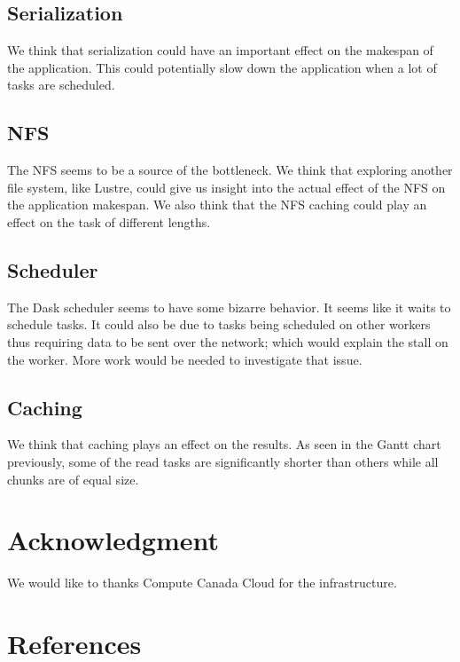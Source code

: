 \documentclass[conference]{IEEEtran}
\begin{document}
\subsection{Serialization}
We think that serialization could have an important effect on the makespan of the
application. This could potentially slow down the application when a lot of tasks are
scheduled.

\subsection{NFS}
The NFS seems to be a source of the bottleneck. We think that exploring another file
system, like Lustre, could give us insight into the actual effect of the NFS on the
application makespan. We also think that the NFS caching could play an effect on the
task of different lengths.

\subsection{Scheduler}
The Dask scheduler seems to have some bizarre behavior. It seems like it waits to
schedule tasks. It could also be due to tasks being scheduled on other workers
thus requiring data to be sent over the network; which would explain the stall on the
worker. More work would be needed to investigate that issue.


\subsection{Caching}
We think that caching plays an effect on the results. As seen in the Gantt chart
previously, some of the read tasks are significantly shorter than others while all
chunks are of equal size.

\section*{Acknowledgment}

We would like to thanks Compute Canada Cloud for the infrastructure.

\section*{References}


\end{document}

